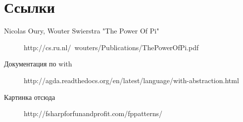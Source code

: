\documentclass[8pt]{extarticle}
\begin{document}
\section{Ссылки}

\begin{description}
\item[Nicolas Oury, Wouter Swierstra "The Power Of Pi"] http://cs.ru.nl/~wouters/Publications/ThePowerOfPi.pdf
\item[Документация по with] 
http://agda.readthedocs.org/en/latest/language/with-abstraction.html
\item[Картинка отсюда] http://fsharpforfunandprofit.com/fppatterns/
\end{description}
\end{document}
